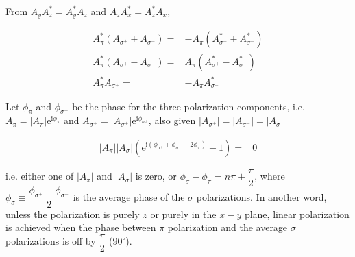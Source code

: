 \documentclass[10pt,fleqn]{article}
\newcommand{\ue}{\mathrm{e}}
\newcommand{\ui}{\mathrm{i}}
\newcommand{\eqar}[1]
{
  \begin{align}
    #1
  \end{align}
}
\newcommand{\paren}[1]{{\left({#1}\right)}}
\newcommand{\abs}[1]{{\left|{#1}\right|}}
\begin{document}
From $A_yA_z^*=A_y^*A_z$ and $A_zA_x^*=A_z^*A_x$,
\eqar{
  A_\pi^*\paren{A_{\sigma^+}+A_{\sigma^-}}=&-A_\pi\paren{A_{\sigma^+}^*+A_{\sigma^-}^*}\\
  A_\pi^*\paren{A_{\sigma^+}-A_{\sigma^-}}=&A_\pi\paren{A_{\sigma^+}^*-A_{\sigma^-}^*}\\
  A_\pi^*A_{\sigma^+}=&-A_\pi A_{\sigma^-}^*
}
Let $\phi_\pi$ and $\phi_{\sigma^\pm}$ be the phase for the three polarization components,
i.e. $A_\pi=\abs{A_\pi}\ue^{\ui\phi_\pi}$ and
$A_{\sigma^\pm}=\abs{A_{\sigma^\pm}}\ue^{\ui\phi_{\sigma^\pm}}$,
also given $\abs{A_{\sigma^+}}=\abs{A_{\sigma^-}}=\abs{A_{\sigma}}$
\eqar{
  \abs{A_\pi}\abs{A_{\sigma}}\paren{\ue^{\ui\paren{\phi_{\sigma^+}+\phi_{\sigma^-}-2\phi_\pi}}-1}=&0
}
i.e. either one of $\abs{A_\pi}$ and $\abs{A_{\sigma}}$ is zero,
or $\phi_\sigma-\phi_\pi=n\pi+\dfrac{\pi}2$,
where $\phi_\sigma\equiv\dfrac{\phi_{\sigma^+}+\phi_{\sigma^-}}{2}$
is the average phase of the $\sigma$ polarizations.
In another word, unless the polarization is purely $z$ or purely in the $x-y$ plane,
linear polarization is achieved when the phase between $\pi$ polarization
and the average $\sigma$ polarizations is off by $\dfrac\pi2$ ($90^\circ$).
\end{document}
